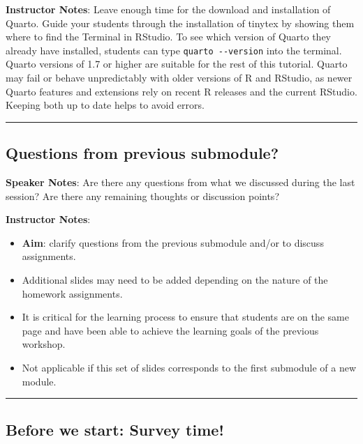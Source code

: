 \documentclass[
  letterpaper,
  DIV=11,
  numbers=noendperiod]{scrartcl}
\begin{document}
\textbf{Instructor Notes}: Leave enough time for the download and
installation of Quarto. Guide your students through the installation of
tinytex by showing them where to find the Terminal in RStudio. To see
which version of Quarto they already have installed, students can type
\texttt{quarto\ -\/-version} into the terminal. Quarto versions of 1.7
or higher are suitable for the rest of this tutorial. Quarto may fail or
behave unpredictably with older versions of R and RStudio, as newer
Quarto features and extensions rely on recent R releases and the current
RStudio. Keeping both up to date helps to avoid errors.

\begin{center}\rule{0.5\linewidth}{0.5pt}\end{center}

\subsection{Questions from previous
submodule?}\label{questions-from-previous-submodule}

\textbf{Speaker Notes}: Are there any questions from what we discussed
during the last session? Are there any remaining thoughts or discussion
points?

\textbf{Instructor Notes}:

\begin{itemize}
\item
  \textbf{Aim}: clarify questions from the previous submodule and/or to
  discuss assignments.
\item
  Additional slides may need to be added depending on the nature of the
  homework assignments.
\item
  It is critical for the learning process to ensure that students are on
  the same page and have been able to achieve the learning goals of the
  previous workshop.
\item
  Not applicable if this set of slides corresponds to the first
  submodule of a new module.
\end{itemize}

\begin{center}\rule{0.5\linewidth}{0.5pt}\end{center}

\subsection{Before we start: Survey
time!}\label{before-we-start-survey-time}
\end{document}
